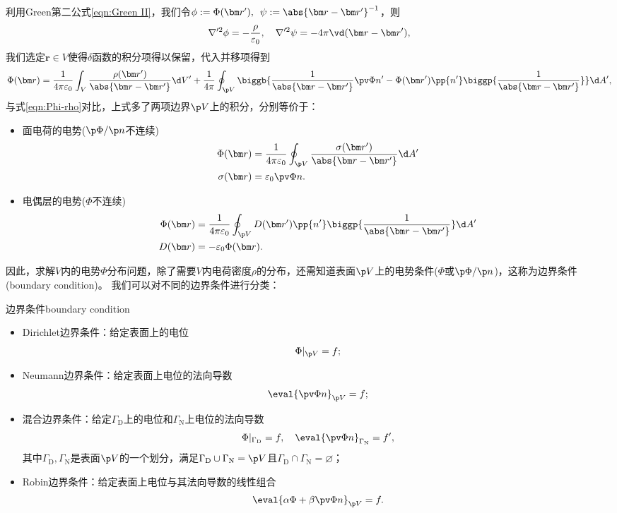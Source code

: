 利用Green第二公式\eqref{eqn:Green II}，我们令$\phi:=\Phi(\bm r'),\enspace\psi:=\abs{\bm r-\bm r'}^{-1}$，则
\[
    \nabla'^2\phi=-\frac{\rho}{\varepsilon_0},\quad\nabla'^2\psi=-4\pi\vd(\bm r-\bm r'),
\]
我们选定$\bm r\in V$使得$\delta$函数的积分项得以保留，代入并移项得到
\begin{equation}
    \label{eqn:Phi-rho with boundary}
        \Phi(\bm r)=\frac1{4\pi\varepsilon_0}\int_V\frac{\rho(\bm r')}{\abs{\bm r-\bm r'}}\d V'+\frac1{4\pi}\oint_{\p V}\biggb{\frac1{\abs{\bm r-\bm r'}}\pv\Phi{n'}-\Phi(\bm r')\pp{n'}\biggp{\frac1{\abs{\bm r-\bm r'}}}}\d A',
\end{equation}
与式\eqref{eqn:Phi-rho}对比，上式多了两项边界$\p V$上的积分，分别等价于：
\begin{itemize}
    \item 面电荷的电势($\p\Phi/\p n$不连续)
    \begin{subequations}
        \begin{align}
            \Phi(\bm r)&=\frac1{4\pi\varepsilon_0}\oint_{\p V}\frac{\sigma(\bm r')}{\abs{\bm r-\bm r'}}\d A'\\
            \sigma(\bm r)&=\varepsilon_0\pv\Phi{n}.
        \end{align}
    \end{subequations}
    \item 电偶层的电势($\Phi$不连续)
    \begin{subequations}
        \begin{align}
            \Phi(\bm r)&=\frac1{4\pi\varepsilon_0}\oint_{\p V}D(\bm r')\pp{n'}\biggp{\frac1{\abs{\bm r-\bm r'}}}\d A'\\
            D(\bm r)&=-\varepsilon_0\Phi(\bm r).
        \end{align}
    \end{subequations}
\end{itemize}
因此，求解$V$内的电势$\Phi$分布问题，除了需要$V$内电荷密度$\rho$的分布，还需知道表面$\p V$上的电势条件($\Phi$或$\p\Phi/\p n$)，这称为边界条件(boundary condition)。
我们可以对不同的边界条件进行分类：
\begin{definition}{边界条件}{boundary condition}
    \begin{itemize}
        \item Dirichlet边界条件：给定表面上的电位
        \[
            \Phi|_{\p V}=f;
        \]
        \item Neumann边界条件：给定表面上电位的法向导数
        \[
            \eval{\pv\Phi n}_{\p V}=f;
        \]
        \item 混合边界条件：给定$\Gamma_{\text{D}}$上的电位和$\Gamma_{\text{N}}$上电位的法向导数
        \[
            \Phi|_{\Gamma_{\text{D}}}=f,\quad
            \eval{\pv\Phi n}_{\Gamma_{\text{N}}}=f',
        \]
        其中$\Gamma_{\text{D}},\Gamma_{\text{N}}$是表面$\p V$的一个划分，满足$\Gamma_{\text{D}}\cup\Gamma_{\text{N}}=\p V$且$\Gamma_{\text{D}}\cap\Gamma_{\text{N}}=\varnothing$；
        \item Robin边界条件：给定表面上电位与其法向导数的线性组合
        \[
            \eval{\alpha\Phi+\beta\pv\Phi n}_{\p V}=f.
        \]
    \end{itemize}
\end{definition}

